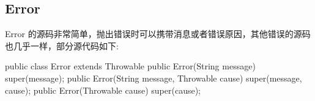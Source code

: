 \subsection{Error}

Error 的源码非常简单，抛出错误时可以携带消息或者错误原因，其他错误的源码也几乎一样，部分源代码如下:

\begin{Java}
public class Error extends Throwable {
    public Error(String message) {
        super(message);
    }
    public Error(String message, Throwable cause) {
        super(message, cause);
    }
    public Error(Throwable cause) {
        super(cause);
    }
}
\end{Java}

\newpage